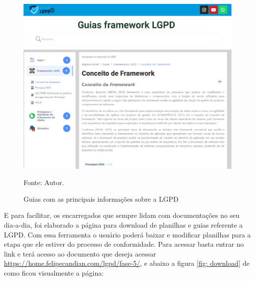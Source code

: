 \documentclass[
	12pt,				%
	openright,			%
	oneside,			%
	a4paper,			%
	english,			%
	french,				%
	spanish,			%
	brazil,				%
	]{abntex2}
\begin{document}
\begin{figure}[ht]
    \centering
    \caption{Guias com as principais informações sobre a LGPD}
    \includegraphics[width=6.0in]{Images/faseglossario.png}
    \label{fig: guiaframe}
    
    \centering \small Fonte: Autor.
\end{figure}

E para facilitar, os encarregados que sempre lidam com documentações no seu dia-a-dia, foi elaborado a página para download de planilhas e guias referente a LGPD. Com essa ferramenta o usuário poderá baixar e modificar planilhas para a etapa que ele estiver do processo de conformidade. Para acessar basta entrar no link e terá acesso ao documento que deseja acessar \url{https://home.felipecandian.com/lgpd/fase-5/}, e abaixo a figura \ref{fig: download} de como ficou visualmente a página:
\end{document}
